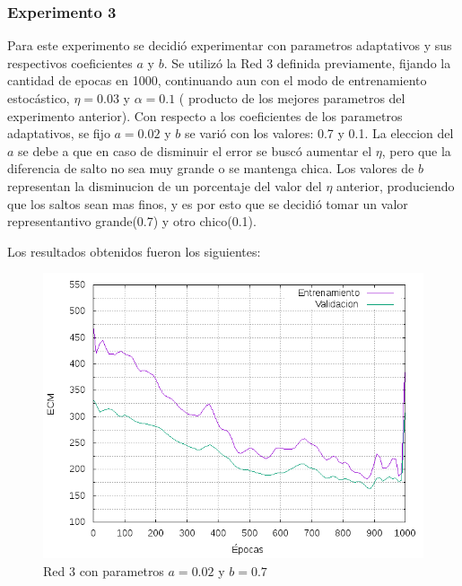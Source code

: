\subsubsection{Experimento 3}
Para este experimento se decidió experimentar con parametros adaptativos y sus respectivos coeficientes $a$ y $b$. Se utilizó la Red 3 definida
previamente, fijando la cantidad de epocas en 1000, continuando aun con el modo de entrenamiento estocástico, $\eta = 0.03$ y $\alpha = 0.1$ ( producto
de los mejores parametros del experimento anterior).
Con respecto a los coeficientes de los parametros adaptativos, se fijo $a = 0.02$ y $b$ se varió con los valores: 0.7 y 0.1. La eleccion del $a$ se debe
a que en caso de disminuir el error se buscó aumentar el $\eta$, pero que la diferencia de salto no sea muy grande o se mantenga chica. Los valores de
 $b$ representan la disminucion de un porcentaje del valor del $\eta$ anterior, produciendo que los saltos sean mas finos, y es por esto que se decidió
 tomar un valor representantivo grande(0.7) y otro chico(0.1).

Los resultados obtenidos fueron los siguientes:
\begin{figure}[H]
  \includegraphics[width=125mm]{imagenes/ej1/ex_3-1_red_11-6-6-9-1_errors.png}
  \caption{Red 3 con parametros $a = 0.02 $ y $b= 0.7$}
\end{figure}

